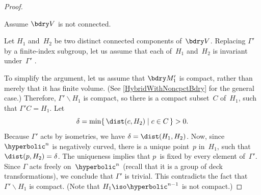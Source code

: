 \begin{proof}
\begin{case} \label{ArithHybrid->Cup=M1PfNotConn}
 Assume $\bdry V$ is not connected.
 \end{case}
 Let $H_1$ and~$H_2$ be two distinct connected components
of~$\bdry V$. Replacing
$\Gamma'$ by a finite-index subgroup, let us assume that
each of~$H_1$ and~$H_2$ is invariant under~$\Gamma'$
.

 To simplify the argument, let us assume that $\bdry M_1'$
is compact, rather than merely that it has finite volume.
(See \cref{HybridWithNoncpctBdry} for the general
case.) Therefore, $\Gamma' \backslash H_1$ is compact, so there
is a compact subset~$C$ of~$H_1$, such that $\Gamma' C =
H_1$. Let 
 $$ \delta = \min \{\, \dist(c, H_2) \mid c \in C\,\} > 0
.$$
 Because $\Gamma'$ acts by isometries, we have $\delta =
\dist(H_1,H_2)$. Now, since $\hyperbolic^n$ is negatively
curved, there is a unique point~$p$ in~$H_1$, such that
$\dist(p,H_2) = \delta$. The uniqueness implies that $p$~is
fixed by every element of~$\Gamma'$. Since $\Gamma$ acts
freely on~$\hyperbolic^n$ (recall that it is a group of
deck transformations), we conclude that $\Gamma'$ is
trivial. This contradicts the fact that $\Gamma' \backslash
H_1$ is compact. (Note that $H_1 \iso \hyperbolic^{n-1}$ is
not compact.)
 \end{proof}

